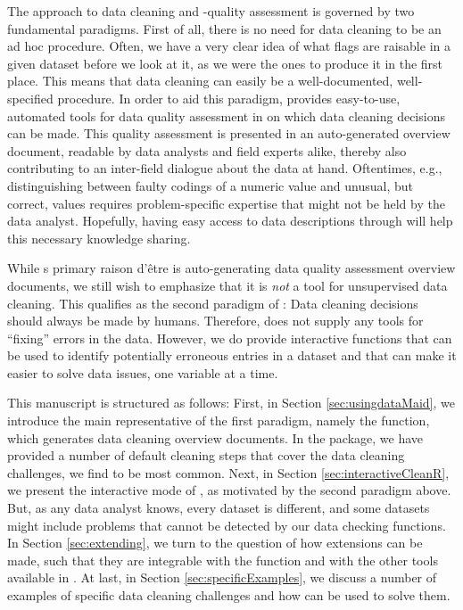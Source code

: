 \documentclass[article,shortnames]{jss}
\begin{document}
The  approach to data cleaning and -quality assessment is
governed by two fundamental paradigms. First of all, there is no need
for data cleaning to be an ad hoc procedure. Often, we have a very
clear idea of what flags are raisable in a given dataset before we
look at it, as we were the ones to produce it in the first place. This
means that data cleaning can easily be a well-documented,
well-specified procedure. In order to aid this paradigm, 
provides easy-to-use, automated tools for data quality assessment in
 \citep{R} on which data cleaning decisions can be made. This quality
assessment is presented in an auto-generated overview document,
readable by data analysts and field experts alike, thereby also
contributing to an inter-field dialogue about the data at
hand. Oftentimes, e.g., distinguishing between faulty codings of a
numeric value and unusual, but correct, values requires
problem-specific expertise that might not be held by the data
analyst. Hopefully, having easy access to data descriptions through
 will help this necessary knowledge sharing.

While s primary raison d'être is auto-generating data
quality assessment overview documents, we still wish to emphasize that
it is \emph{not} a tool for unsupervised data cleaning. This qualifies
as the second paradigm of : Data cleaning decisions
should always be made by humans. Therefore,  does not
supply any tools for ``fixing'' errors in the data. However, we do
provide interactive functions that can be used to identify potentially
erroneous entries in a dataset and that can make it easier to solve
data issues, one variable at a time.


This manuscript is structured as follows: First, in Section
\ref{sec:usingdataMaid}, we introduce the main representative of the first
paradigm, namely the  function, which generates data
cleaning overview documents. In the  package, we have
provided a number of default cleaning steps that cover the data
cleaning challenges, we find to be most common. Next, in Section
\ref{sec:interactiveCleanR}, we present the interactive mode of , as motivated
by the second paradigm above. But, as any data analyst knows,
every dataset is different, and some datasets might include problems
that cannot be detected by our data checking functions. In Section
\ref{sec:extending}, we turn to the question of how  extensions
can be made, such that they are integrable with the 
function and with the other tools available in .  At last,
in Section \ref{sec:specificExamples}, we discuss a number of examples of
specific data cleaning challenges and how  can be used to
solve them.
\end{document}
